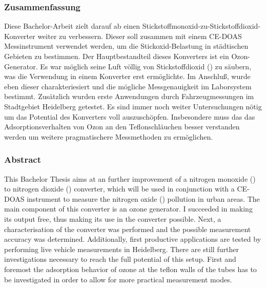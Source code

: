 
\subsubsection*{Zusammenfassung}
\label{sec:Zusammenfassung}

Diese Bachelor-Arbeit zielt darauf ab einen
Stickstoffmonoxid-zu-Stickstoffdioxid-Konverter weiter zu
verbessern. Dieser soll zusammen mit einem CE-DOAS Messinstrument
verwendet werden, um die Stickoxid-Belastung in städtischen Gebieten
zu bestimmen. Der Hauptbestandteil dieses Konverters ist ein
Ozon-Generator. Es war möglich seine Luft völlig von Stickstoffdioxid
() zu säubern, was die Verwendung in einem Konverter erst
ermöglichte. Im Anschluß, wurde eben dieser charakteriesiert und die
mögliche  Messgenauigkeit im Laborsystem bestimmt. Zusätzlich
wurden erste Anwendungen durch Fahrzeugmessungen im Stadtgebiet
Heidelberg getestet. Es sind immer noch weiter Untersuchungen nötig um
das Potential des Konverters voll auszuschöpfen. Insbesondere muss das
das Adsorptionsverhalten von Ozon an den Teflonschläuchen besser
verstanden werden um weitere pragmatischere Messmethoden zu
ermöglichen.


\subsubsection*{Abstract}
\label{sec:abstract}

This Bachelor Thesis aims at an further improvement of a nitrogen
monoxide () to nitrogen dioxide () converter, which
will be used in conjunction with a CE-DOAS instrument to measure the
nitrogen oxide () pollution in urban areas. The main
component of this converter is an ozone generator. I succeeded in
making its output  free, thus making its use in the converter
possible. Next, a characterisation of the converter was performed and
the possible  measurement accuracy was
determined. Additionally, first productive applications are tested by 
performing live vehicle measurements in Heidelberg. There are still
further investigations necessary to reach the full potential of this
setup. First and foremost the adsorption behavior of ozone at the
teflon walls of the tubes has to be investigated in order to allow for
more practical measurement modes.

